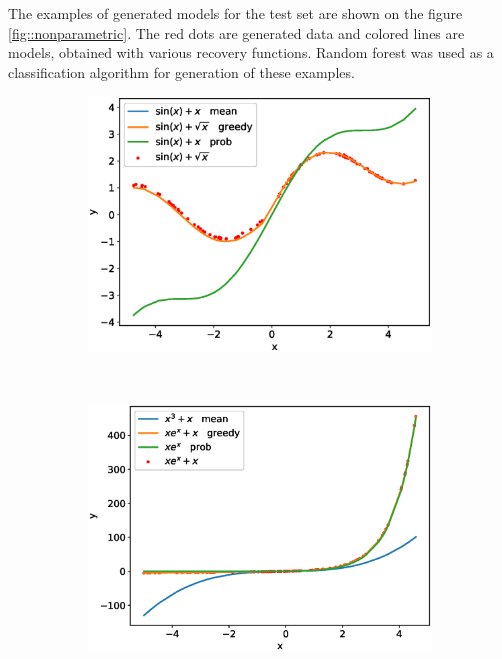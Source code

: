 \documentclass[12pt]{article}
\begin{document}
The examples of generated models for the test set are shown on the figure \ref{fig::nonparametric}.
The red dots are generated data and colored lines are models, obtained with various recovery functions.
Random forest was used as a classification algorithm for generation of these examples.
\begin{figure}[!ht]
\centering
\begin{subfigure}{0.48\textwidth}
\includegraphics[width=\textwidth]{_non_param_1.eps}
\caption{}
\label{fig::_non_param_1}
\end{subfigure}
~
\begin{subfigure}{0.48\textwidth}
\includegraphics[width=\textwidth]{_non_param_2.eps}
\caption{}
\label{fig::_non_param_2}
\end{subfigure}

\end{figure}
\end{document}
